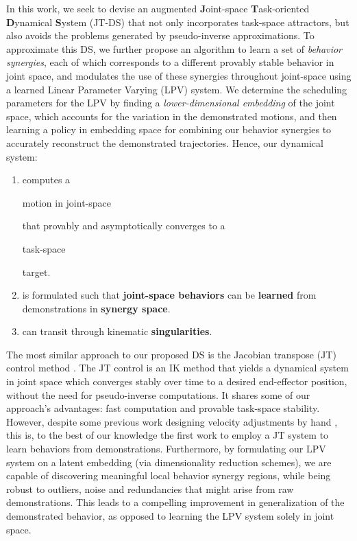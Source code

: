\documentclass[letterpaper, 10 pt, conference,fleqn]{ieeeconf}
\begin{document}
In this work, we seek to devise an augmented \textbf{J}oint-space \textbf{T}ask-oriented \textbf{D}ynamical \textbf{S}ystem (JT-DS) that not only incorporates task-space attractors, but also avoids the problems generated by pseudo-inverse approximations. To approximate this DS, we further propose an algorithm to learn a set of \emph{behavior synergies}, each of which corresponds to a different provably stable behavior in joint space, and modulates the use of these synergies throughout joint-space using a learned Linear Parameter Varying (LPV) system. We determine the scheduling parameters for the LPV by finding a \emph{lower-dimensional embedding} of the joint space, which accounts for the variation in the demonstrated motions, and then learning a policy in embedding space for combining our behavior synergies to accurately reconstruct the demonstrated trajectories. 
Hence, our dynamical system:
\begin{enumerate}[leftmargin=*]
\item computes a \begin{bf}motion in joint-space\end{bf} that provably and asymptotically converges to a \begin{bf}task-space \end{bf}target.
\item is formulated such that \textbf{joint-space behaviors} can be \textbf{learned} from demonstrations in \textbf{synergy space}.
\item can transit through kinematic \textbf{singularities}.
\end{enumerate}


The most similar approach to our proposed DS is the Jacobian transpose (JT) control method \cite{wolovich1984computational} . The JT control is an IK method that yields a dynamical system in joint space
which converges stably over time to a desired end-effector position, without the need for pseudo-inverse computations. It shares some of our approach's advantages: fast computation and provable task-space stability. However, despite some previous work designing velocity adjustments by hand \cite{Shi2016}, this is, to the best of our knowledge the first work to employ a JT system to learn behaviors from demonstrations. Furthermore, by formulating our LPV system on a latent embedding (via dimensionality reduction schemes), we are capable of discovering meaningful local behavior synergy regions, while being robust to outliers, noise and redundancies that might arise from raw demonstrations. This leads to a compelling improvement in generalization of the demonstrated behavior, as opposed to learning the LPV system solely in joint space. 
\end{document}
